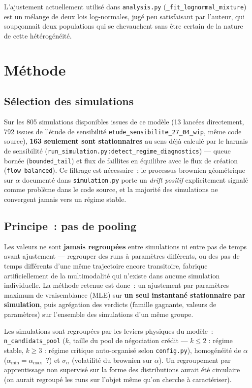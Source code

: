 \documentclass[11pt,a4paper]{article}
\begin{document}
L'ajustement actuellement utilisé dans \texttt{analysis.py}
(\texttt{\_fit\_lognormal\_mixture}) est un mélange de deux lois
log-normales, jugé peu satisfaisant par l'auteur, qui soupçonnait deux
populations qui se chevauchent sans être certain de la nature de cette
hétérogénéité.

\section{Méthode}

\subsection{Sélection des simulations}

Sur les 805 simulations disponibles issues de ce modèle (13 lancées
directement, 792 issues de l'étude de sensibilité
\texttt{etude\_sensibilite\_27\_04\_wip}, même code source), \textbf{163
seulement sont stationnaires} au sens déjà calculé par le harnais de
sensibilité (\texttt{run\_simulation.py:detect\_regime\_diagnostics}) ---
queue bornée (\texttt{bounded\_tail}) et flux de faillites en équilibre avec
le flux de création (\texttt{flow\_balanced}). Ce filtrage est nécessaire~:
le processus brownien géométrique sur $\alpha$ documenté dans
\texttt{simulation.py} porte un \emph{drift positif} explicitement signalé
comme problème dans le code source, et la majorité des simulations ne
convergent jamais vers un régime stable.

\subsection{Principe~: pas de pooling}

Les valeurs ne sont \textbf{jamais regroupées} entre simulations ni entre
pas de temps avant ajustement --- regrouper des runs à paramètres différents,
ou des pas de temps différents d'une même trajectoire encore transitoire,
fabrique artificiellement de la multimodalité qui n'existe dans aucune
simulation individuelle. La méthode retenue est donc~: un ajustement par
paramètres maximum de vraisemblance (MLE) sur \textbf{un seul instantané
stationnaire par simulation}, puis agrégation des verdicts (famille
gagnante, valeurs de paramètres) sur l'ensemble des simulations d'un même
groupe.

Les simulations sont regroupées par les leviers physiques du modèle~:
\texttt{n\_candidats\_pool} ($k$, taille du pool de négociation crédit ---
$k\le 2$ : régime stable, $k\ge 3$ : régime critique auto-organisé selon
\texttt{config.py}), homogénéité de $\alpha$
($\alpha_{\min}=\alpha_{\max}$~?) et $\sigma_\alpha$ (volatilité du
brownien sur $\alpha$). Un regroupement par apprentissage non supervisé sur
la forme des distributions aurait été circulaire (on aurait regroupé les
runs sur l'objet même qu'on cherche à caractériser).
\end{document}
